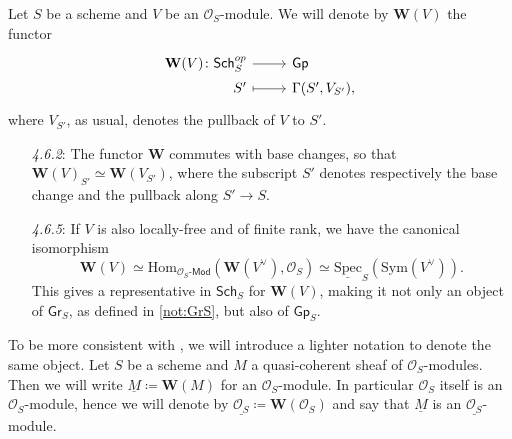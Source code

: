 \documentclass[../Main]{subfiles}
\begin{document}
\begin{defn}
	Let $S$ be a scheme and $V$ be an $\mathcal{O}_{ S }$-module.
	We will denote by $\mathbf{W}(V)$ the functor
	\begin{equation*}
	\begin{tikzcd}[row sep = 0ex
		,/tikz/column 1/.append style={anchor=base east}
		,/tikz/column 2/.append style={anchor=base west}]
		\mathbf{W}(V)\colon 
		\mathsf{Sch}_{ S }^{op} \arrow[r, "", rightarrow] &
		\mathsf{Gp} \\
		S' \arrow[r, "", mapsto] & 
		\Gamma(S', V_{S'})
	,\end{tikzcd}
	\end{equation*} 
	where $V_{S'}$, as usual, denotes the pullback of
	$V$ to $S'$.
\end{defn}


\begin{rem}\leavevmode\vspace{-1.2\baselineskip}
\begin{enumerate}
\item[{\em 4.6.2}:]
	The functor $\mathbf{W}$ commutes with base changes,
	so that $\mathbf{W}(V)_{S'} \simeq \mathbf{W}(V_{S'})$,
	where the subscript $S'$ denotes respectively the base change 
	and the pullback along $S' \to S$.

\item[{\em 4.6.5}:]
	If $V$ is also  locally-free and of finite rank, we have the canonical isomorphism
	\begin{equation*}
		\mathbf{W}(V) \simeq
		\mathrm{Hom}_{ \mathcal{O}_{ S }\text{-}\mathsf{Mod} }
		\left(\mathbf{W}(V^\vee) , \mathcal{O}_{ S } \right) \simeq
		\underline{\mathrm{Spec}}_S(\mathrm{Sym}(V^\vee))
	.\end{equation*}
	This gives a representative in $\mathsf{Sch}_{ S }$ for 
	$\mathbf{W}(V)$, making it not only an object of $\mathsf{Gr}_S$,
	as defined in \cref{not:GrS}, but also of $\mathsf{Gp}_S$.
\end{enumerate}
\end{rem}


\begin{ntt}\label{not:fppfOsModule}
	To be more consistent with \cite{Messing}, we will introduce a 
	lighter notation to denote the same object.
	Let $S$ be a scheme and $M$ a quasi-coherent sheaf of $\mathcal{O}_{ S }$-modules.
	Then we will write $\underline{M} \coloneqq \mathbf{W}(M)$ for
	an $\mathcal{O}_{ S }$-module.
	In particular $\mathcal{O}_{ S }$ itself is an $\mathcal{O}_{ S }$-module, hence
	we will denote by $\underline{\mathcal{O}_{ S }} \coloneqq \mathbf{W}(\mathcal{O}_{ S })$
	and say that $\underline{M}$ is an $\underline{\mathcal{O}_{ S }}$-module.
\end{ntt}
\end{document}
